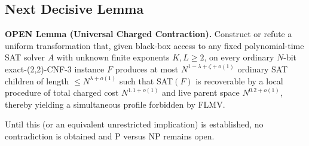 \subsection{Next Decisive Lemma}
\textbf{OPEN Lemma (Universal Charged Contraction).} Construct or refute a uniform transformation that, given black-box access to any fixed polynomial-time SAT solver $A$ with unknown finite exponents $K,L\ge 2$, on every ordinary $N$-bit exact-(2,2)-CNF-3 instance $F$ produces at most $N^{1-\lambda+\zeta+o(1)}$ ordinary SAT children of length $\le N^{\lambda+o(1)}$ such that SAT$(F)$ is recoverable by a local procedure of total charged cost $N^{1.1+o(1)}$ and live parent space $N^{0.2+o(1)}$, thereby yielding a simultaneous profile forbidden by FLMV.

Until this (or an equivalent unrestricted implication) is established, no contradiction is obtained and P versus NP remains open.

